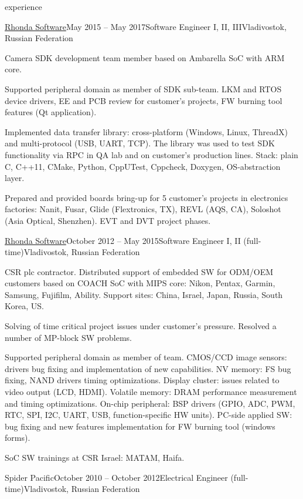 \documentclass{template}
\begin{document}
\begin{rSection}{experience}
\begin{rCompany}{\href{http://www.rhondasoftware.com}{Rhonda Software}}{May 2015 -- May 2017}{Software Engineer I, II, III}{Vladivostok, Russian Federation}
\item Camera SDK development team member based on Ambarella SoC with ARM core.
\item Supported peripheral domain as member of SDK sub-team. LKM and RTOS device drivers, EE and PCB review for customer's projects,
      FW burning tool features (Qt application).
\item Implemented data transfer library: cross-platform (Windows, Linux, ThreadX) and multi-protocol (USB, UART, TCP). The library was used to test SDK functionality
      via RPC in QA lab and on customer's production lines. Stack: plain C, C++11, CMake, Python, CppUTest, Cppcheck, Doxygen, OS-abstraction layer.
\item Prepared and provided boards bring-up for 5 customer's projects in electronics factories: Nanit, Fusar, Glide (Flextronics, TX), REVL (AQS, CA),
      Soloshot (Asia Optical, Shenzhen). EVT and DVT project phases.

\end{rCompany}
\begin{rCompany}{\href{http://www.rhondasoftware.com}{Rhonda Software}}{October 2012 -- May 2015}{Software Engineer I, II (full-time)}{Vladivostok, Russian Federation}

\item CSR plc contractor. Distributed support of embedded SW for ODM/OEM customers based on COACH SoC with MIPS core:
      Nikon, Pentax, Garmin, Samsung, Fujifilm, Ability. Support sites: China, Israel, Japan, Russia, South Korea, US.
\item Solving of time critical project issues under customer's pressure. Resolved a number of MP-block SW problems.
\item Supported peripheral domain as member of team. CMOS/CCD image sensors: drivers bug fixing and implementation of new capabilities.
      NV memory: FS bug fixing, NAND drivers timing optimizations. Display cluster: issues related to video output (LCD, HDMI). Volatile memory:
      DRAM performance measurement and timing optimizations. On-chip peripheral: BSP drivers (GPIO, ADC, PWM, RTC, SPI, I2C, UART, USB, function-specific HW units).
      PC-side applied SW: bug fixing and new features implementation for FW burning tool (windows forms).
\item SoC SW trainings at CSR Israel: MATAM, Haifa.

\end{rCompany}
\begin{rCompany}{Spider Pacific}{October 2010 -- October 2012}{Electrical Engineer (full-time)}{Vladivostok, Russian Federation}


\end{rCompany}
\end{rSection}
\end{document}

